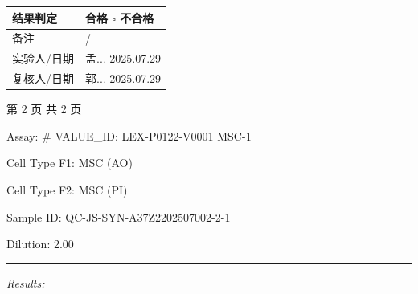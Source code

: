 \documentclass[UTF8,10pt,a4paper,fontset=fandol]{ctexart}
\newcommand{\fieldvalue}[1]{#1}
\newcommand{\handwritten}[1]{#1}
\begin{document}
\begin{center}
\begin{center}
\begin{tabularx}{\textwidth}{|p{}|X|}
\hline
结果判定 &
\fieldvalue{\handwritten{\checkmark}} 合格 \quad $\square$ 不合格 \\
\hline
备注 &
\fieldvalue{\handwritten{/}} \\
\hline
实验人/日期 &
\fieldvalue{\handwritten{孟...}}\quad
\fieldvalue{\handwritten{2025.07.29}} \\
\hline
复核人/日期 &
\fieldvalue{\handwritten{郭...}}\quad
\fieldvalue{\handwritten{2025.07.29}} \\
\hline
\end{tabularx}

\begin{center}
第 2 页 共 2 页
\end{center}

\newpage

Assay: %
# VALUE_ID: LEX-P0122-V0001
\fieldvalue{MSC-1}

Cell Type F1: %
\fieldvalue{MSC (AO)}

Cell Type F2: %
\fieldvalue{MSC (PI)}

Sample ID: %
\fieldvalue{QC-JS-SYN-A37Z2202507002-2-1}

Dilution: %
\fieldvalue{2.00}

\noindent\rule{\textwidth}{0.4pt}

\textit{Results:}

\vspace{0.5em}


\end{center}
\end{center}
\end{document}
